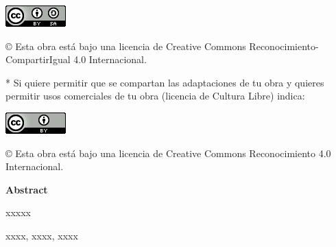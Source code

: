 \documentclass[a4paper,12pt,oneside]{report}
\newenvironment{summary}
{\par\noindent\begin{center}\textbf{Abstract}\end{center}\begin{itshape}\par\noindent}
{\end{itshape}}
\newenvironment{keywords}
{\begin{list}{}{\setlength{\leftmargin}{1em}}\item[\hskip\labelsep \bfseries Keywords:]}
{\end{list}}
\newenvironment{palabrasClave}
{\begin{list}{}{\setlength{\leftmargin}{1em}}\item[\hskip\labelsep \bfseries Palabras clave:]}
{\end{list}}
\begin{document}
\begin{center}
\includegraphics[scale=1.8]{images/by-sa_88x31}\\[5mm]
\end{center}

\begin{large}
© Esta obra está bajo una licencia de Creative Commons Reconocimiento-CompartirIgual 4.0 Internacional.
\end{large}

\bigskip
\bigskip
\bigskip
* Si quiere permitir que se compartan las adaptaciones de tu obra y quieres permitir usos comerciales de tu obra (licencia de Cultura Libre) indica:

\begin{center}
\includegraphics[scale=1.8]{images/by_88x31}\\[5mm]
\end{center}

\begin{large}
© Esta obra está bajo una licencia de Creative Commons Reconocimiento 4.0 Internacional.
\end{large}

\newpage 
\thispagestyle{empty}

\begin{abstract}
{\em
xxxxx
}

\begin{palabrasClave}
xxxxx, xxxx, xxxx
\end{palabrasClave}

\end{abstract}
\newpage 
\vspace*{200pt}
\thispagestyle{empty}

\begin{summary}
{
xxxxx
}

\em
\begin {keywords}
xxxx, xxxx, xxxx
\end {keywords}

\end{summary}
\newpage{\pagestyle{empty}}
\thispagestyle{empty}
\end{document}
